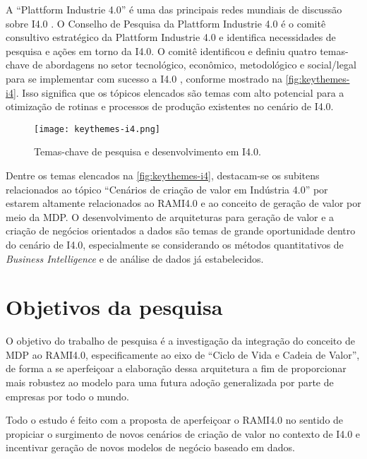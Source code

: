 	A ``Plattform Industrie 4.0'' é uma das principais redes mundiais de discussão sobre I4.0 \cite{kagermann2013recommendations, acatech2014plattform, germany2019plattform}. O Conselho de Pesquisa da Plattform Industrie 4.0 é o comitê consultivo estratégico da Plattform Industrie 4.0 e identifica necessidades de pesquisa e ações em torno da I4.0. O comitê identificou e definiu quatro temas-chave de abordagens no setor tecnológico, econômico, metodológico e social/legal para se implementar com sucesso a I4.0 \cite{hirsch-kreinsen2019keythemes}, conforme mostrado na \autoref{fig:keythemes-i4}. Isso significa que os tópicos elencados são temas com alto potencial para a otimização de rotinas e processos de produção existentes no cenário de I4.0.
	
	\begin{figure}[htb]
		\centering
		\caption{Temas-chave de pesquisa e desenvolvimento em I4.0.}
		\label{fig:keythemes-i4}
		\texttt{[image: keythemes-i4.png]}
	\end{figure}

	Dentre os temas elencados na \autoref{fig:keythemes-i4}, destacam-se os subitens relacionados ao tópico ``Cenários de criação de valor em Indústria 4.0'' por estarem altamente relacionados ao RAMI4.0 e ao conceito de geração de valor por meio da MDP. O desenvolvimento de arquiteturas para geração de valor e a criação de negócios orientados a dados são temas de grande oportunidade dentro do cenário de I4.0, especialmente se considerando os métodos quantitativos de \textit{Business Intelligence} e de análise de dados já estabelecidos.
	

\section{Objetivos da pesquisa}

	O objetivo do trabalho de pesquisa é a investigação da integração do conceito de MDP ao RAMI4.0, especificamente ao eixo de ``Ciclo de Vida e Cadeia de Valor'', de forma a se aperfeiçoar a elaboração dessa arquitetura a fim de proporcionar mais robustez ao modelo para uma futura adoção generalizada por parte de empresas por todo o mundo.
	
	Todo o estudo é feito com a proposta de aperfeiçoar o RAMI4.0 no sentido de propiciar o surgimento de novos cenários de criação de valor no contexto de I4.0 e incentivar geração de novos modelos de negócio baseado em dados.
	
